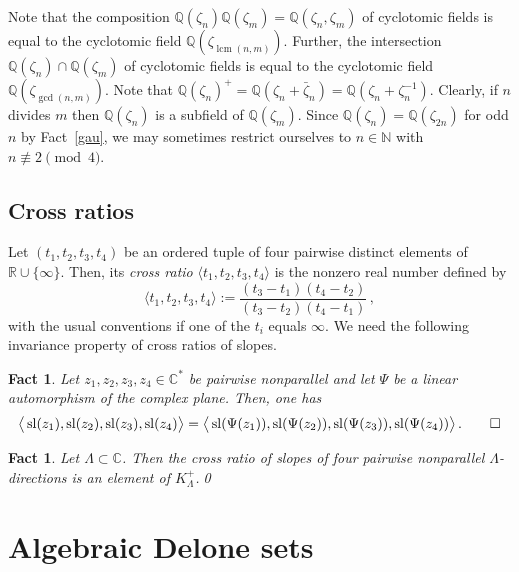 \documentclass[a4paper]{amsart}
\newtheorem{fact}[theorem]{Fact}
\theoremstyle{definition}
\numberwithin{equation}{section}
\numberwithin{theorem}{section}
\begin{document}
Note that the composition ${\mathbb{Q}}(\zeta_n){\mathbb{Q}}(\zeta_m)={\mathbb{Q}}(\zeta_n,\zeta_m)$
of cyclotomic fields is equal to the cyclotomic field 
${\mathbb{Q}}(\zeta_{\operatorname{lcm}(n,m)})$. Further, the intersection
${\mathbb{Q}}(\zeta_n)\cap{\mathbb{Q}}(\zeta_m)$ of cyclotomic fields is equal to the cyclotomic field 
${\mathbb{Q}}(\zeta_{\operatorname{gcd}(n,m)})$.  Note that ${\mathbb{Q}}(\zeta_n)^+={\mathbb{Q}}(\zeta_n+\bar{\zeta}_n)={\mathbb{Q}}(\zeta_n+\zeta_n^{-1})$. Clearly, if $n$ divides $m$ then
${\mathbb{Q}}(\zeta_n)$ is a subfield of ${\mathbb{Q}}(\zeta_m)$. Since
${\mathbb{Q}}(\zeta_n)={\mathbb{Q}}(\zeta_{2n})$ for odd $n$ by Fact~\ref{gau}, we may sometimes restrict ourselves to $n\in{\mathbb{N}}$ with $n\not\equiv 2 \pmod 4$.

\subsection{Cross ratios}

Let $(t_1,t_2,t_3,t_4)$ be an ordered tuple of four pairwise distinct
elements of $\mathbb{R}\cup\{\infty\}$. Then, its {\em cross ratio}
$\langle t_1,t_2,t_3,t_4\rangle$ is the nonzero real number defined by
$$
\langle t_1,t_2,t_3,t_4\rangle := \frac{(t_3 - t_1)(t_4 - t_2)}{(t_3 - t_2)(t_4 - t_1)}\,,
$$
with the usual conventions if one of the $t_i$ equals
$\infty$. We need the following invariance property of cross ratios of slopes.

\begin{fact}\cite[Lemma 2.17]{H}\label{crossratio}
Let $z_1,z_2,z_3,z_4\in {\mathbb{C}}^*$ be  pairwise
nonparallel and let $\Psi$ be a linear automorphism of
the complex plane. Then, one has
$$
\big\langle \operatorname{sl}(z_{1}),\operatorname{sl}(z_{2}),\operatorname{sl}(z_{3}),\operatorname{sl}(z_{4})\big\rangle = \big\langle \operatorname{sl}(\Psi(z_1)),\operatorname{sl}(\Psi(z_2)),\operatorname{sl}(\Psi(z_3)),\operatorname{sl}(\Psi(z_4))\big\rangle\,.\qed
$$  
\end{fact}

\begin{fact}\cite[Lemma 2.20]{H}\label{crkn4gen}
Let $\varLambda\subset{\mathbb{C}}$.  Then the
cross ratio of slopes of four pairwise nonparallel
$\varLambda$-directions is an element of $K_{\varLambda}^+$.\qed
\end{fact}

\section{Algebraic Delone sets}
\end{document}
